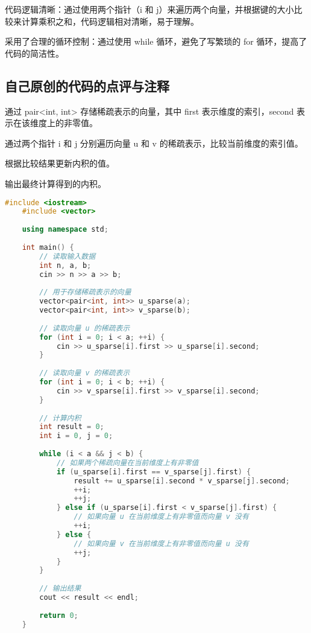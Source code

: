 代码逻辑清晰：通过使用两个指针（i 和 j）来遍历两个向量，并根据键的大小比较来计算乘积之和，代码逻辑相对清晰，易于理解。

采用了合理的循环控制：通过使用 while 循环，避免了写繁琐的 for 循环，提高了代码的简洁性。

\subsection{自己原创的代码的点评与注释}

通过 pair<int, int> 存储稀疏表示的向量，其中 first 表示维度的索引，second 表示在该维度上的非零值。

通过两个指针 i 和 j 分别遍历向量 u 和 v 的稀疏表示，比较当前维度的索引值。

根据比较结果更新内积的值。

输出最终计算得到的内积。

\begin{lstlisting}[language=C++]
    #include <iostream>
    #include <vector>
    
    using namespace std;
    
    int main() {
        // 读取输入数据
        int n, a, b;
        cin >> n >> a >> b;
    
        // 用于存储稀疏表示的向量
        vector<pair<int, int>> u_sparse(a);
        vector<pair<int, int>> v_sparse(b);
    
        // 读取向量 u 的稀疏表示
        for (int i = 0; i < a; ++i) {
            cin >> u_sparse[i].first >> u_sparse[i].second;
        }
    
        // 读取向量 v 的稀疏表示
        for (int i = 0; i < b; ++i) {
            cin >> v_sparse[i].first >> v_sparse[i].second;
        }
    
        // 计算内积
        int result = 0;
        int i = 0, j = 0;
    
        while (i < a && j < b) {
            // 如果两个稀疏向量在当前维度上有非零值
            if (u_sparse[i].first == v_sparse[j].first) {
                result += u_sparse[i].second * v_sparse[j].second;
                ++i;
                ++j;
            } else if (u_sparse[i].first < v_sparse[j].first) {
                // 如果向量 u 在当前维度上有非零值而向量 v 没有
                ++i;
            } else {
                // 如果向量 v 在当前维度上有非零值而向量 u 没有
                ++j;
            }
        }
    
        // 输出结果
        cout << result << endl;
    
        return 0;
    }    
\end{lstlisting}